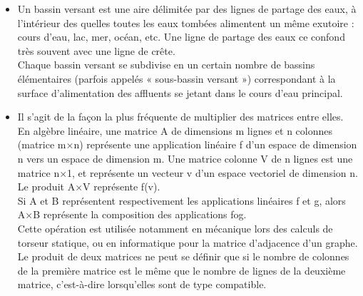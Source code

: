 \begin{itemize}

	\item Un bassin versant\footnotemark[1]{} est une aire délimitée par des lignes de partage des eaux, à l'intérieur des quelles toutes les eaux tombées alimentent un même exutoire : cours d'eau, lac, mer, océan, etc. Une ligne de partage des eaux ce confond très souvent avec une ligne de crête.\\

	Chaque bassin versant se subdivise en un certain nombre de bassins élémentaires (parfois appelés « sous-bassin versant ») correspondant à la surface d'alimentation des affluents se jetant dans le cours d'eau principal.\\

	\item Il s'agit de la façon la plus fréquente de multiplier des matrices\footnotemark[2]{} entre elles.\\
	En algèbre linéaire, une matrice A de dimensions m lignes et n colonnes (matrice m×n) représente une application linéaire f d'un espace de dimension n vers un espace de dimension m. Une matrice colonne V de n lignes est une matrice n×1, et représente un vecteur v d'un espace vectoriel de dimension n. Le produit A×V représente f(v).\\
	Si A et B représentent respectivement les applications linéaires f et g, alors A×B représente la composition des applications fog.\\
	Cette opération est utilisée notamment en mécanique lors des calculs de torseur statique, ou en informatique pour la matrice d'adjacence d'un graphe. \\
	Le produit de deux matrices ne peut se définir que si le nombre de colonnes de la première matrice est le même que le nombre de lignes de la deuxième matrice, c'est-à-dire lorsqu'elles sont de type compatible.\\


\end{itemize}
